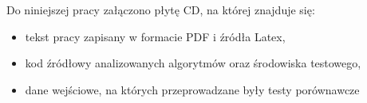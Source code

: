 Do niniejszej pracy załączono płytę CD, na której znajduje się:
\begin{itemize}
	\item tekst pracy zapisany w formacie PDF i źródła Latex,
	\item kod źródłowy analizowanych algorytmów oraz środowiska testowego,
	\item dane wejściowe, na których przeprowadzane były testy porównawcze
\end{itemize}